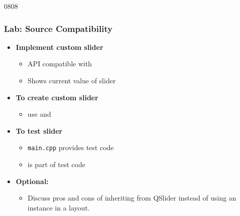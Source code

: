 \begin{slide}{0808}
\frametitle{Lab: Source Compatibility}
\label{project_slider_with_indicator}
 \begin{itemize}
  \item \textbf{Implement custom slider}
    \begin{itemize}
    \item API compatible with 
    \item Shows current value of slider
    \end{itemize}
 \item \textbf{To create custom slider}
    \begin{itemize}
    \item use  and 
    \end{itemize}
  \item \textbf{To test slider}
    \begin{itemize}
    \item \texttt{main.cpp} provides test code
    \item {} is part of test code
    \end{itemize}
  \item \textbf{Optional:}
    \begin{itemize}
    \item  Discuss pros and cons of inheriting from
      QSlider instead of using an instance in a layout.
    \end{itemize}
  \end{itemize}
  \vfill
  
\end{slide}

